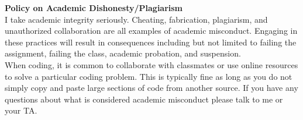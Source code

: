 \documentclass[12pt]{article}
\begin{document}











\noindent \Large \textbf{Policy on Academic Dishonesty/Plagiarism}\normalsize\\

\noindent I take academic integrity seriously. Cheating, fabrication, plagiarism, and unauthorized collaboration are all examples of academic misconduct.  Engaging in these practices will result in consequences including but not limited to failing the assignment, failing the class, academic probation, and suspension.\\

\noindent When coding, it is common to collaborate with classmates or use online resources to solve a particular coding problem.  This is typically fine as long as you do not simply copy and paste large sections of code from another source.  If you have any questions about what is considered academic misconduct please talk to me or your TA.
\end{document}
